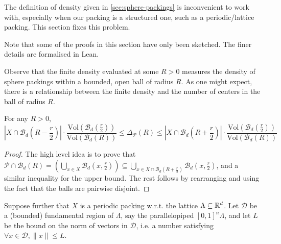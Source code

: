 The definition of density given in \cref{sec:sphere-packings} is inconvenient to work with, especially when our packing is a structured one, such as a periodic/lattice packing. This section fixes this problem.

Note that some of the proofs in this section have only been sketched. The finer details are formalised in Lean.

Observe that the finite density evaluated at some $R > 0$ measures the density of sphere packings within a bounded, open ball of radius $R$. As one might expect, there is a relationship between the finite density and the number of centers in the ball of radius $R$.

\begin{lemma}\label{lemma:sp-finite-density-bound}\leanok
  For any $R > 0$,
  \[
    \left|X \cap \mathcal{B}_d\left(R - \frac{r}{2}\right)\right| \cdot \frac{\mathrm{Vol}\left(\mathcal{B}_d\left(\frac{r}{2}\right)\right)}{\mathrm{Vol}(\mathcal{B}_d(R))}
    \leq \Delta_{\mathcal{P}}(R)
    \leq \left|X \cap \mathcal{B}_d\left(R + \frac{r}{2}\right)\right| \cdot \frac{\mathrm{Vol}\left(\mathcal{B}_d\left(\frac{r}{2}\right)\right)}{\mathrm{Vol}(\mathcal{B}_d(R))}
  \]
\end{lemma}
\begin{proof}\leanok
  The high level idea is to prove that $\mathcal{P} \cap \mathcal{B}_d(R) = \left(\bigcup_{x \in X} \mathcal{B}_d\left(x, \frac{r}{2}\right)\right) \subseteq \bigcup_{x \in X \cap \mathcal{B}_d\left(R + \frac{r}{2}\right)} \mathcal{B}_d\left(x, \frac{r}{2}\right)$, and a similar inequality for the upper bound. The rest follows by rearranging and using the fact that the balls are pairwise disjoint.
\end{proof}

Suppose further that $X$ is a periodic packing w.r.t. the lattice $\Lambda \subseteq \mathbb{R}^d$. Let $\mathcal{D}$ be a (bounded) fundamental region of $\Lambda$, say the parallelopiped $[0, 1]^n\Lambda$, and let $L$ be the bound on the norm of vectors in $\mathcal{D}$, i.e. a number satisfying $\forall x \in \mathcal{D}, \|x\| \leq L$.

